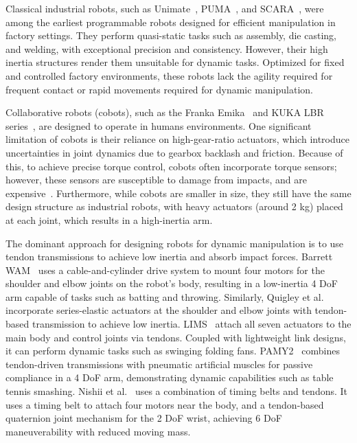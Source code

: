 Classical industrial robots, such as Unimate~\cite{devol1961programmed}, PUMA~\cite{beecher1979puma}, and SCARA~\cite{makino1980selective}, were among the earliest programmable robots designed for efficient manipulation in factory settings. They perform quasi-static tasks such as assembly, die casting, and welding, with exceptional precision and consistency. However, their high inertia structures render them unsuitable for dynamic tasks. Optimized for fixed and controlled factory environments, these robots lack the agility required for frequent contact or rapid movements required for dynamic manipulation.

Collaborative robots (cobots), such as the Franka Emika~\cite{haddadin2022franka} and KUKA LBR series~\cite{hirzinger2001new, hirzinger2002dlr, albu2007dlr}, are designed to operate in humans environments. One significant limitation of cobots is their reliance on high-gear-ratio actuators, which introduce uncertainties in joint dynamics due to gearbox backlash and friction. Because of this, to achieve precise torque control, cobots often incorporate torque sensors; however, these sensors are susceptible to damage from impacts, and are expensive~\cite{zhu2023design}. Furthermore, while cobots are smaller in size, they still have the same design structure as industrial robots, with heavy actuators (around 2 kg) placed at each joint, which results in a high-inertia arm.

The dominant approach for designing robots for dynamic manipulation is to use tendon transmissions to achieve low inertia and absorb impact forces. Barrett WAM~\cite{rooks2006harmonious} uses a cable-and-cylinder drive system to mount four motors for the shoulder and elbow joints on the robot’s body, resulting in a low-inertia 4 DoF arm capable of tasks such as batting and throwing. Similarly, Quigley et al.~\cite{quigley2011low} incorporate series-elastic actuators at the shoulder and elbow joints with tendon-based transmission to achieve low inertia. LIMS~\cite{kim2015design, song2018development} attach all seven actuators to the main body and control joints via tendons. Coupled with lightweight link designs, it can perform dynamic tasks such as swinging folding fans. PAMY2~\cite{guist2024safe} combines tendon-driven transmissions with pneumatic artificial muscles for passive compliance in a 4 DoF arm, demonstrating dynamic capabilities such as table tennis smashing. Nishii et al.~\cite{nishii2023ultra} uses a combination of timing belts and tendons. It uses a timing belt to attach four motors near the body, and a tendon-based quaternion joint mechanism for the 2 DoF wrist, achieving 6 DoF maneuverability with reduced moving mass. 

